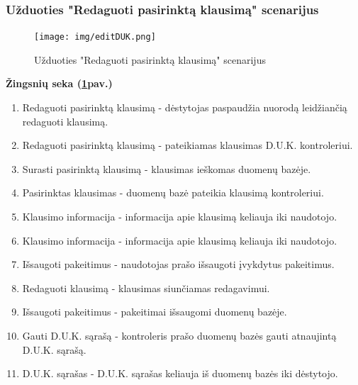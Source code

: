 \documentclass{VUMIFPSkursinis}
\begin{document}
\subsubsection{Užduoties "Redaguoti pasirinktą klausimą" scenarijus}
\begin{figure}[H]
	\centering
	\texttt{[image: img/editDUK.png]}
	\caption{Užduoties "Redaguoti pasirinktą klausimą" scenarijus}
	\label{fig:editDuk}
\end{figure}
\textbf{Žingsnių seka (\ref{fig:editDuk}pav.)}\\
\begin{enumerate}
	\item Redaguoti pasirinktą klausimą - dėstytojas paspaudžia nuorodą leidžiančią redaguoti klausimą.
	\item Redaguoti pasirinktą klausimą - pateikiamas klausimas D.U.K. kontroleriui.
	\item Surasti pasirinktą klausimą - klausimas ieškomas duomenų bazėje.
	\item Pasirinktas klausimas - duomenų bazė pateikia klausimą kontroleriui.
	\item Klausimo informacija -  informacija apie klausimą keliauja iki naudotojo.
	\item Klausimo informacija - informacija apie klausimą keliauja iki naudotojo.
	\item Išsaugoti pakeitimus - naudotojas prašo išsaugoti įvykdytus pakeitimus.
	\item Redaguoti klausimą - klausimas siunčiamas redagavimui.
	\item Išsaugoti pakeitimus - pakeitimai išsaugomi duomenų bazėje.
	\item Gauti D.U.K. sąrašą - kontroleris prašo duomenų bazės gauti atnaujintą D.U.K. sąrašą.
	\item D.U.K. sąrašas - D.U.K. sąrašas keliauja iš duomenų bazės iki dėstytojo.
\end{enumerate}
\end{document}
